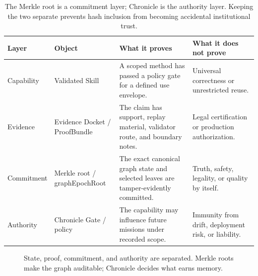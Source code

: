 \documentclass[11pt,letterpaper]{article}
\newcommand{\Chronicle}{\mathsf{Chronicle}}
\begin{document}
\begin{table}[H]
\small
\centering
\begin{tabularx}{\textwidth}{p{1.35in}Y Y Y}
\toprule
Layer & Object & What it proves & What it does not prove\\
\midrule
Capability & Validated Skill & A scoped method has passed a policy gate for a defined use envelope. & Universal correctness or unrestricted reuse.\\
Evidence & Evidence Docket / ProofBundle & The claim has support, replay material, validator route, and boundary notes. & Legal certification or production authorization.\\
Commitment & Merkle root / graphEpochRoot & The exact canonical graph state and selected leaves are tamper-evidently committed. & Truth, safety, legality, or quality by itself.\\
Authority & Chronicle Gate / policy & The capability may influence future missions under recorded scope. & Immunity from drift, deployment risk, or liability.\\
\bottomrule
\end{tabularx}
\caption{The Merkle root is a commitment layer; Chronicle is the authority layer. Keeping the two separate prevents hash inclusion from becoming accidental institutional trust.}
\end{table}

\begin{figure}[H]
\centering
{}
\caption{State, proof, commitment, and authority are separated. Merkle roots make the graph auditable; Chronicle decides what earns memory.}
\end{figure}
\end{document}
